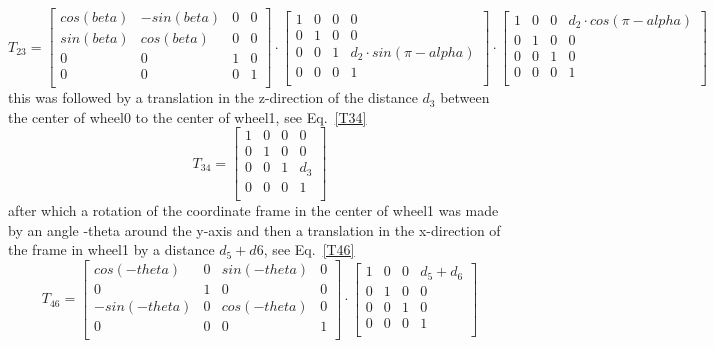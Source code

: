 \begin{equation}
    T_{23} = 
    \begin{bmatrix}
    cos(beta)&-sin(beta)&0&0\\
    sin(beta)&cos(beta)&0&0\\
    0&0&1&0\\
    0&0&0&1\\
    \end{bmatrix}
    \cdot
    \begin{bmatrix}
    1&0&0&0\\
    0&1&0&0\\
    0&0&1&d_2\cdot sin(\pi-alpha)\\
    0&0&0&1\\
    \end{bmatrix}
    \cdot
    \begin{bmatrix}
    1&0&0&d_2\cdot cos(\pi-alpha)\\
    0&1&0&0\\
    0&0&1&0\\
    0&0&0&1\\
    \end{bmatrix}
    \label{T23}
\end{equation}
this was followed by a translation in the z-direction of the distance \(d_3\) between the center of wheel0 to the center of wheel1, see Eq.~\eq\ref{T34}
\begin{equation}
    T_{34} = 
    \begin{bmatrix}
    1&0&0&0\\
    0&1&0&0\\
    0&0&1&d_3\\
    0&0&0&1\\
    \end{bmatrix}
    \label{T34}
\end{equation}
after which a rotation of the coordinate frame in the center of wheel1 was made by an angle -theta around the y-axis and then a translation in the x-direction of the frame in wheel1 by a distance \(d_5 + d6\), see Eq.~\eq\ref{T46}
\begin{equation}
    T_{46} =
    \begin{bmatrix}
    cos(-theta)&0&sin(-theta)&0\\
    0&1&0&0\\
    -sin(-theta)&0&cos(-theta)&0\\
    0&0&0&1\\
    \end{bmatrix}
    \cdot
     \begin{bmatrix}
    1&0&0&d_5 + d_6\\
    0&1&0&0\\
    0&0&1&0\\
    0&0&0&1\\
    \end{bmatrix}
    \label{T46}
\end{equation}
